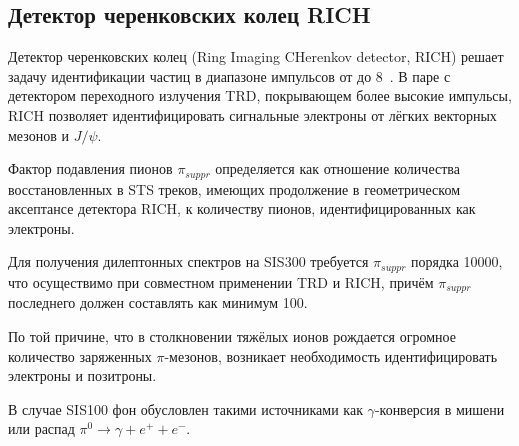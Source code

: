 
\subsection{Детектор черенковских колец RICH}\label{sec:secRICH}

Детектор черенковских колец (Ring Imaging CHerenkov detector, RICH) решает задачу идентификации частиц в диапазоне импульсов от до 8~\GeVoverC{}.
В паре с детектором переходного излучения TRD, покрывающем более высокие импульсы, RICH позволяет идентифицировать сигнальные электроны от лёгких векторных мезонов и $J/\psi$.

Фактор подавления пионов $\pi_{suppr}$ определяется как отношение количества восстановленных в STS треков, имеющих продолжение в геометрическом аксептансе детектора RICH, к количеству пионов, идентифицированных как электроны.

Для получения дилептонных спектров на SIS300 требуется $\pi_{suppr}$ порядка 10000, что осуществимо при совместном применении TRD и RICH, причём $\pi_{suppr}$ последнего должен составлять как минимум 100.

По той причине, что в столкновении тяжёлых ионов рождается огромное количество заряженных $\pi$-мезонов, возникает необходимость идентифицировать электроны и позитроны.

В случае SIS100 фон обусловлен такими источниками как $\gamma$-конверсия в мишени или распад $\pi^{0} \rightarrow \gamma + e^{+} + e^{-}$.

